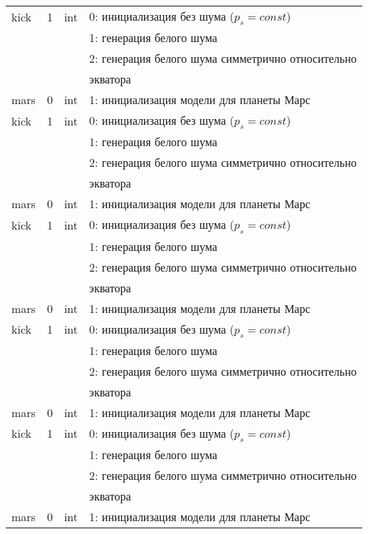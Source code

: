 \begin{longtable}[c]{|l|c|l|l|}
    kick & 1 & int & 0: инициализация без шума (\(p_s = const\)) \\
          &   &     & 1: генерация белого шума                  \\
          &   &     & 2: генерация белого шума симметрично относительно \\
      & & & экватора    \\
     mars & 0 & int & 1: инициализация модели для планеты Марс     \\
    kick & 1 & int & 0: инициализация без шума (\(p_s = const\)) \\
          &   &     & 1: генерация белого шума                  \\
          &   &     & 2: генерация белого шума симметрично относительно \\
      & & & экватора    \\
     mars & 0 & int & 1: инициализация модели для планеты Марс     \\
    kick & 1 & int & 0: инициализация без шума (\(p_s = const\)) \\
          &   &     & 1: генерация белого шума                  \\
          &   &     & 2: генерация белого шума симметрично относительно \\
      & & & экватора    \\
     mars & 0 & int & 1: инициализация модели для планеты Марс     \\
    kick & 1 & int & 0: инициализация без шума (\(p_s = const\)) \\
          &   &     & 1: генерация белого шума                  \\
          &   &     & 2: генерация белого шума симметрично относительно \\
      & & & экватора    \\
     mars & 0 & int & 1: инициализация модели для планеты Марс     \\
    kick & 1 & int & 0: инициализация без шума (\(p_s = const\)) \\
          &   &     & 1: генерация белого шума                  \\
          &   &     & 2: генерация белого шума симметрично относительно \\
      & & & экватора    \\
     mars & 0 & int & 1: инициализация модели для планеты Марс     \\
    \end{longtable}
\normalsize%
\endgroup

